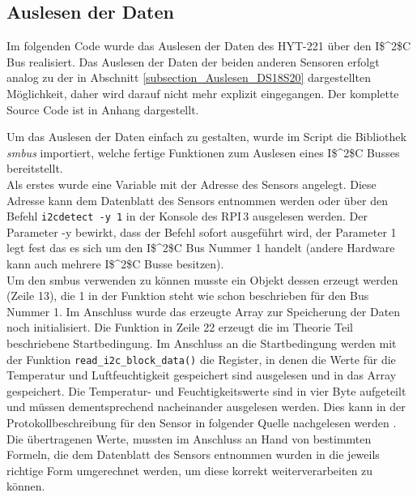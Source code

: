 \subsection{Auslesen der Daten}
\label{subsection_Auslesen der Daten HYT221}
Im folgenden Code wurde das Auslesen der Daten des HYT-221 über den \ac{I$^2$C} Bus realisiert. Das Auslesen der Daten der beiden anderen Sensoren erfolgt analog zu der in Abschnitt \ref{subsection_Auslesen_DS18S20} dargestellten Möglichkeit, daher wird darauf nicht mehr explizit eingegangen. Der komplette Source Code ist in Anhang dargestellt.



Um das Auslesen der Daten einfach zu gestalten, wurde im Script die Bibliothek \textit{smbus} importiert, welche fertige Funktionen zum Auslesen eines \ac{I$^2$C} Busses bereitstellt.\\
Als erstes wurde eine Variable mit der Adresse des Sensors angelegt. Diese Adresse kann dem Datenblatt des Sensors entnommen werden oder über den Befehl \texttt{i2cdetect -y 1} in der Konsole des \ac{RPI}\,3 ausgelesen werden. Der Parameter -y bewirkt, dass der Befehl sofort ausgeführt wird, der Parameter 1 legt fest das es sich um den \ac{I$^2$C} Bus Nummer 1 handelt (andere Hardware kann auch mehrere \ac{I$^2$C} Busse besitzen).\\
Um den smbus verwenden zu können musste ein Objekt dessen erzeugt werden (Zeile 13), die 1 in der Funktion steht wie schon beschrieben für den Bus Nummer 1. Im Anschluss wurde das erzeugte Array zur Speicherung der Daten noch initialisiert. Die Funktion in Zeile 22 erzeugt die im Theorie Teil beschriebene Startbedingung. Im Anschluss an die Startbedingung werden mit der Funktion \texttt{read\_i2c\_block\_data()} die Register, in denen die Werte für die Temperatur und Luftfeuchtigkeit gespeichert sind ausgelesen und in das Array gespeichert. Die Temperatur- und Feuchtigkeitswerte sind in vier Byte aufgeteilt und müssen dementsprechend nacheinander ausgelesen werden. Dies kann in der Protokollbeschreibung für den Sensor in folgender Quelle nachgelesen werden \citep{Datenblatt_I2C_HYT221}. Die übertragenen Werte, mussten im Anschluss an Hand von bestimmten Formeln, die dem Datenblatt des Sensors entnommen wurden in die jeweils richtige Form umgerechnet werden, um diese korrekt weiterverarbeiten zu können.

